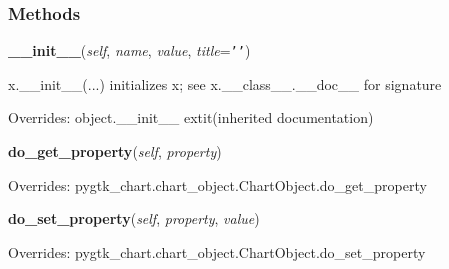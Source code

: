   \subsubsection{Methods}

    \vspace{0.5ex}

\hspace{.8\funcindent}\begin{boxedminipage}{\funcwidth}

    \raggedright \textbf{\_\_init\_\_}(\textit{self}, \textit{name}, \textit{value}, \textit{title}={\tt \texttt{'}\texttt{}\texttt{'}})

\setlength{\parskip}{2ex}
    x.\_\_init\_\_(...) initializes x; see x.\_\_class\_\_.\_\_doc\_\_ for 
    signature

\setlength{\parskip}{1ex}
      Overrides: object.\_\_init\_\_ 	extit{(inherited documentation)}

    \end{boxedminipage}

    \vspace{0.5ex}

\hspace{.8\funcindent}\begin{boxedminipage}{\funcwidth}

    \raggedright \textbf{do\_get\_property}(\textit{self}, \textit{property})

\setlength{\parskip}{2ex}
\setlength{\parskip}{1ex}
      Overrides: pygtk\_chart.chart\_object.ChartObject.do\_get\_property

    \end{boxedminipage}

    \vspace{0.5ex}

\hspace{.8\funcindent}\begin{boxedminipage}{\funcwidth}

    \raggedright \textbf{do\_set\_property}(\textit{self}, \textit{property}, \textit{value})

\setlength{\parskip}{2ex}
\setlength{\parskip}{1ex}
      Overrides: pygtk\_chart.chart\_object.ChartObject.do\_set\_property

    \end{boxedminipage}

    \label{pygtk_chart:bar_chart:Bar:get_value_label_size}

